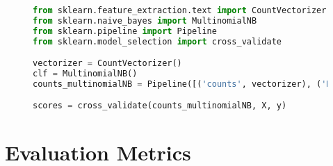 \documentclass[]{article}
\begin{document}
\begin{figure}[!htb]
\begin{lstlisting}[frame=single,language=python,caption={Benchmark model}]
from sklearn.feature_extraction.text import CountVectorizer
from sklearn.naive_bayes import MultinomialNB
from sklearn.pipeline import Pipeline
from sklearn.model_selection import cross_validate

vectorizer = CountVectorizer()
clf = MultinomialNB()
counts_multinomialNB = Pipeline([('counts', vectorizer), ('MultiNB', clf)])

scores = cross_validate(counts_multinomialNB, X, y)
\end{lstlisting}
\end{figure}

\section{Evaluation Metrics}
\end{document}
